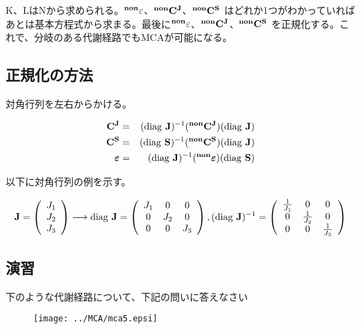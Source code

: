 K、LはNから求められる。\({\bf {}^{non}\varepsilon}\)、\({\bf {}^{non}C^J}\)、\({\bf {}^{non}C^S}\) はどれか1つがわかっていればあとは基本方程式から求まる。最後に\({\bf {}^{non}\varepsilon}\)、\({\bf {}^{non}C^J}\)、\({\bf {}^{non}C^S}\) を正規化する。これで、分岐のある代謝経路でもMCAが可能になる。

\subsection{正規化の方法}
対角行列を左右からかける。

\begin{eqnarray*}
{\bf C^J} & = & ({\rm diag}\ {\bf J})^{-1}({\bf {}^{non}C^J})({\rm diag}\ \bf J)\\
{\bf C^S} & = & ({\rm diag}\ {\bf S})^{-1}({\bf {}^{non}C^S})({\rm diag}\ \bf J)\\
{\boldsymbol \varepsilon} & = & ({\rm diag}\ {\bf J})^{-1}({\bf {}^{non}\boldsymbol \varepsilon})({\rm diag}\ \bf S)
\end{eqnarray*}

以下に対角行列の例を示す。

\[
{\bf J}=\left(
\begin{array}{r}
J_1\\
J_2\\
J_3
\end{array}
\right)
\longrightarrow
{\rm diag}\ {\bf J}=\left(
\begin{array}{ccc}
J_1 & 0 & 0 \\
0   & J_2 & 0\\
0   & 0   & J_3
\end{array}
\right)
,
({\rm diag}\ {\bf J})^{-1}=\left(
\begin{array}{ccc}
\frac{1}{J_1} & 0 & 0 \\
0   & \frac{1}{J_2} & 0\\
0   & 0   & \frac{1}{J_3}
\end{array}
\right)
\]
\subsection{演習}
下のような代謝経路について、下記の問いに答えなさい
\begin{figure}[h]
\begin{center}
\texttt{[image: ../MCA/mca5.epsi]}
\end{center}
\end{figure}

